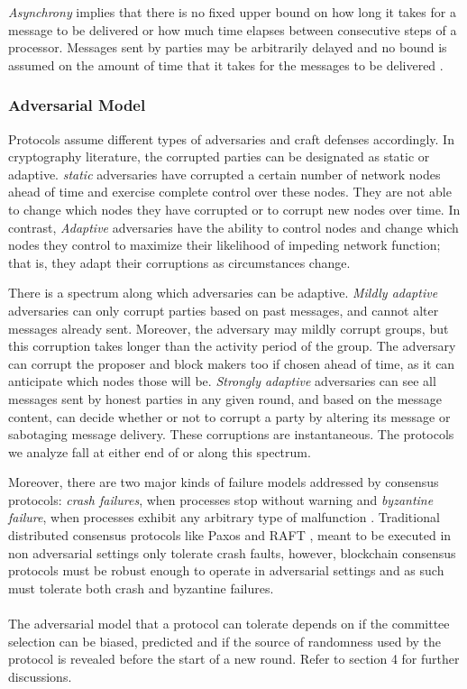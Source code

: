 \documentclass[10pt,journal,compsoc]{IEEEtran}
\begin{document}


\emph{Asynchrony} implies that there is no fixed upper bound on how long it takes for a message to be delivered or how much time elapses between consecutive steps of a processor. Messages sent by parties may be arbitrarily delayed and no bound is assumed on the amount of time that it takes for the messages to be delivered \cite{Mahnush}. 

\subsubsection{Adversarial Model}
Protocols assume different types of adversaries and craft defenses accordingly. In cryptography literature, the corrupted parties can be designated as static or adaptive. \emph{static} adversaries have corrupted a certain number of network nodes ahead of time and exercise complete control over these nodes. They are not able to change which nodes they have corrupted or to corrupt new nodes over time. In contrast, \emph{Adaptive} adversaries have the ability to control nodes and change which nodes they control to maximize their likelihood of impeding network function; that is, they adapt their corruptions as circumstances change. 

There is a spectrum along which adversaries can be adaptive. \emph{Mildly adaptive} adversaries can only corrupt parties based on past messages, and cannot alter messages already sent. Moreover, the adversary may mildly corrupt groups, but this corruption takes longer than the activity period of the group. The adversary can corrupt the proposer and block makers too if chosen ahead of time, as it can anticipate which nodes those will be. \emph{Strongly adaptive} adversaries can see all messages sent by honest parties in any given round, and based on the message content, can decide whether or not to corrupt a party by altering its message or sabotaging message delivery. These corruptions are instantaneous. The protocols we analyze fall at either end of or along this spectrum.

Moreover, there are two major kinds of failure models addressed by consensus protocols: \emph{crash failures}, when processes stop without warning and \emph{byzantine failure}, when processes exhibit any arbitrary type of malfunction \cite{FLP}. Traditional distributed consensus protocols like Paxos \cite{Paxos} and RAFT \cite{Raft}, meant to be executed in non adversarial settings only tolerate crash faults, however, blockchain consensus protocols must be robust enough to operate in adversarial settings and as such must tolerate both crash and byzantine failures. 
\\\\
The adversarial model that a protocol can tolerate depends on if the committee selection can be biased, predicted and if the source of randomness used by the protocol is revealed before the start of a new round. Refer to section 4 for further discussions. 
\end{document}
